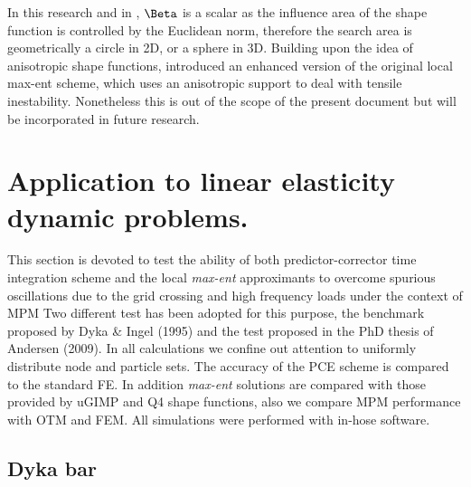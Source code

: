 In this research and in \cite{Arroyo2006}, $\Beta$ is a scalar as the
influence area of the shape function is controlled by the Euclidean
norm, therefore the search area is geometrically a circle in 2D, or a
sphere in 3D. Building upon the idea of anisotropic shape functions,
\cite{Kochmann2019} introduced an enhanced version of the original
local max-ent scheme, which uses an anisotropic support to deal with
tensile inestability. Nonetheless this is out of the scope of the
present document but will be incorporated in future research.

\section{Application to linear elasticity dynamic problems.}
\label{sec:Application-linear-elasticity-dynamic-problems}

This section is devoted to test the ability of both predictor-corrector
time integration scheme and the local \textit{max-ent} approximants to
overcome spurious oscillations due to the grid crossing and high
frequency loads under the context of MPM Two different test has
been adopted for this purpose, the benchmark proposed by Dyka \& Ingel
(1995)\cite{Dyka1995} and the test proposed in the PhD thesis of
Andersen (2009)\cite{thesis_Andersen_2009}. In all calculations we confine out attention to
uniformly distribute node and particle sets. The accuracy of the PCE
scheme is compared to the standard FE. In addition \textit{max-ent} solutions
are compared with those provided by uGIMP and Q4 shape functions, also
we compare MPM performance with OTM and FEM. All simulations were
performed with in-hose software. 

\subsection{Dyka bar}
\label{sec:dyka-bar}

